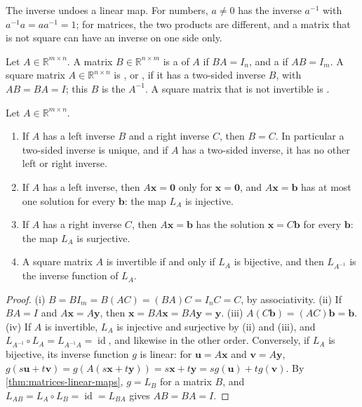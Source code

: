 The inverse undoes a linear map. For numbers, $a\ne0$ has the inverse $a^{-1}$ with $a^{-1}a=aa^{-1}=1$; for matrices, the two products are different, and a matrix that is not square can have an inverse on one side only.

\begin{definition}[Inverses]
\label{def:matrix-inverse}
Let $A\in\mathbb R^{m\times n}$. A matrix $B\in\mathbb R^{n\times m}$ is a  of $A$ if $BA=I_n$, and a  if $AB=I_m$. A square matrix $A\in\mathbb R^{n\times n}$ is , or , if it has a two-sided inverse $B$, with $AB=BA=I$; this $B$ is the  $A^{-1}$. A square matrix that is not invertible is .
\end{definition}

\begin{proposition}
\label{prop:one-sided-inverses}
Let $A\in\mathbb R^{m\times n}$.
\begin{enumerate}
\item If $A$ has a left inverse $B$ and a right inverse $C$, then $B=C$. In particular a two-sided inverse is unique, and if $A$ has a two-sided inverse, it has no other left or right inverse.
\item If $A$ has a left inverse, then $A\mathbf x=\mathbf 0$ only for $\mathbf x=\mathbf 0$, and $A\mathbf x=\mathbf b$ has at most one solution for every $\mathbf b$: the map $L_A$ is injective.
\item If $A$ has a right inverse $C$, then $A\mathbf x=\mathbf b$ has the solution $\mathbf x=C\mathbf b$ for every $\mathbf b$: the map $L_A$ is surjective.
\item A square matrix $A$ is invertible if and only if $L_A$ is bijective, and then $L_{A^{-1}}$ is the inverse function of $L_A$.
\end{enumerate}
\end{proposition}

\begin{proof}
(i) $B=BI_m=B(AC)=(BA)C=I_nC=C$, by associativity. (ii) If $BA=I$ and $A\mathbf x=A\mathbf y$, then $\mathbf x=BA\mathbf x=BA\mathbf y=\mathbf y$. (iii) $A(C\mathbf b)=(AC)\mathbf b=\mathbf b$. (iv) If $A$ is invertible, $L_A$ is injective and surjective by (ii) and (iii), and $L_{A^{-1}}\circ L_A=L_{A^{-1}A}=\operatorname{id}$, and likewise in the other order. Conversely, if $L_A$ is bijective, its inverse function $g$ is linear: for $\mathbf u=A\mathbf x$ and $\mathbf v=A\mathbf y$, $g(s\mathbf u+t\mathbf v)=g(A(s\mathbf x+t\mathbf y))=s\mathbf x+t\mathbf y=sg(\mathbf u)+tg(\mathbf v)$. By \cref{thm:matrices-linear-maps}, $g=L_B$ for a matrix $B$, and $L_{AB}=L_A\circ L_B=\operatorname{id}=L_{BA}$ gives $AB=BA=I$.
\end{proof}

